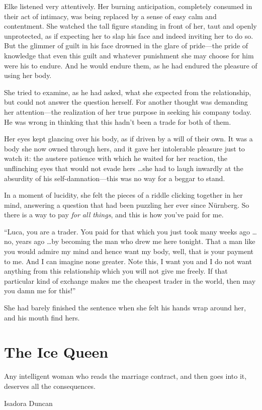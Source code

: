 Elke listened very attentively. Her burning anticipation, completely consumed in their act of intimacy, was being replaced by a sense of easy calm and contentment. She watched the tall figure standing in front of her, taut and openly unprotected, as if expecting her to slap his face and indeed inviting her to do so. But the glimmer of guilt in his face drowned in the glare of pride---the pride of knowledge that even this guilt and whatever punishment she may choose for him were his to endure. And he would endure them, as he had endured the pleasure of using her body.

She tried to examine, as he had asked, what she expected from the relationship, but could not answer the question herself. For another thought was demanding her attention---the realization of her true purpose in seeking his company today. He was wrong in thinking that this hadn't been a trade for both of them.

Her eyes kept glancing over his body, as if driven by a will of their own. It was a body she now owned through hers, and it gave her intolerable pleasure just to watch it: the austere patience with which he waited for her reaction, the unflinching eyes that would not evade hers \ldots she had to laugh inwardly at the absurdity of his self-damnation---this was no way for a beggar to stand.

In a moment of lucidity, she felt the pieces of a riddle clicking together in her mind, answering a question that had been puzzling her ever since Nürnberg. So there is a way to pay \emph{for all things}, and this is how you've paid for me.

``Luca, you are a trader. You paid for that which you just took many weeks ago \ldots no, years ago \ldots by becoming the man who drew me here tonight. That a man like you would admire my mind and hence want my body, well, that is your payment to me. And I can imagine none greater. Note this, I want you and I do not want anything from this relationship which you will not give me freely. If that particular kind of exchange makes me the cheapest trader in the world, then may you damn me for this!''

She had barely finished the sentence when she felt his hands wrap around her, and his mouth find hers.

\chapter{The Ice Queen}

\epigraph{Any intelligent woman who reads the marriage contract, and then goes into it, deserves all the consequences.}{Isadora Duncan}

